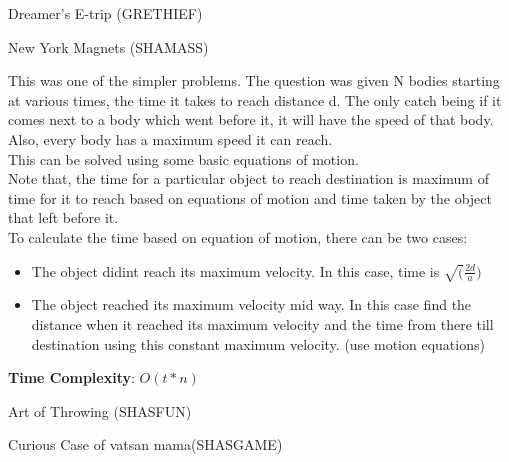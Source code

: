 \documentclass[solution,addpoints,12pt]{exam}
\begin{document}
\begin{questions}
\question

  Dreamer's E-trip (GRETHIEF)

\begin{solution}
  
\end{solution}

\question
  New York Magnets (SHAMASS)

\begin{solution}
    This was one of the simpler problems. The question was given N bodies starting at various times, the time it takes to reach distance d. The only 
    catch being if it comes next to a body which went before it, it will have the speed of that body. Also, every body has a maximum speed it can reach. \\
    
    This can be solved using some basic equations of motion. \\
    Note that, the time for a particular object to reach destination is maximum of time for it to reach based on equations of motion and time taken
    by the object that left before it. \\
    
    To calculate the time based on equation of motion, there can be two cases:
    \begin{itemize}
      \item 
	The object didint reach its maximum velocity. In this case, time is $\sqrt(\frac{2d}{a})$
     \item
      The object reached its maximum velocity mid way. In this case find the distance when it reached its maximum velocity and the time from there till
      destination using this constant maximum velocity. (use motion equations)
    \end{itemize}
    
    \textbf{Time Complexity}: $O(t \ast n)$
\end{solution}

\question

  Art of Throwing (SHASFUN)
  
\begin{solution}
 
 
\end{solution}


\question
  Curious Case of vatsan mama(SHASGAME)

\begin{solution}
 
 
\end{solution}



\end{questions}
\end{document}

